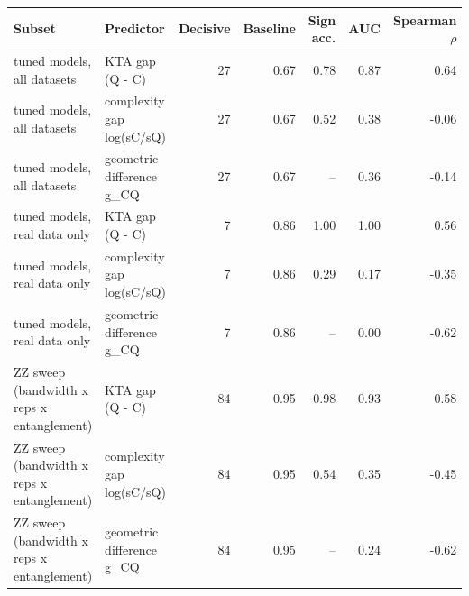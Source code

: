 \begin{tabular}{llrrrrr}
\toprule
Subset & Predictor & Decisive & Baseline & Sign acc. & AUC & Spearman $\rho$ \\
\midrule
tuned models, all datasets & KTA gap (Q - C) & 27 & 0.67 & 0.78 & 0.87 & 0.64 \\
tuned models, all datasets & complexity gap log(sC/sQ) & 27 & 0.67 & 0.52 & 0.38 & -0.06 \\
tuned models, all datasets & geometric difference g\_CQ & 27 & 0.67 & -- & 0.36 & -0.14 \\
\midrule
tuned models, real data only & KTA gap (Q - C) & 7 & 0.86 & 1.00 & 1.00 & 0.56 \\
tuned models, real data only & complexity gap log(sC/sQ) & 7 & 0.86 & 0.29 & 0.17 & -0.35 \\
tuned models, real data only & geometric difference g\_CQ & 7 & 0.86 & -- & 0.00 & -0.62 \\
\midrule
ZZ sweep (bandwidth x reps x entanglement) & KTA gap (Q - C) & 84 & 0.95 & 0.98 & 0.93 & 0.58 \\
ZZ sweep (bandwidth x reps x entanglement) & complexity gap log(sC/sQ) & 84 & 0.95 & 0.54 & 0.35 & -0.45 \\
ZZ sweep (bandwidth x reps x entanglement) & geometric difference g\_CQ & 84 & 0.95 & -- & 0.24 & -0.62 \\
\bottomrule
\end{tabular}

